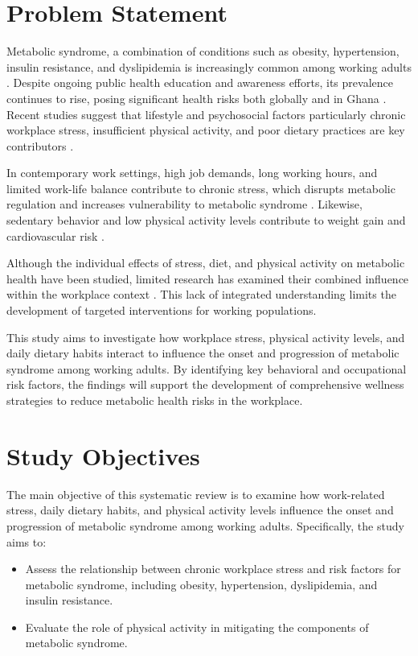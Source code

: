\section{Problem Statement}
Metabolic syndrome, a combination of conditions such as obesity, hypertension, insulin resistance, and dyslipidemia is increasingly common among working adults \citep{alberti2009harmonizing}. Despite ongoing public health education and awareness efforts, its prevalence continues to rise, posing significant health risks both globally and in Ghana \citep{adeboye2012epidemiology}. Recent studies suggest that lifestyle and psychosocial factors particularly chronic workplace stress, insufficient physical activity, and poor dietary practices are key contributors \citep{griep2015job}.

\par In contemporary work settings, high job demands, long working hours, and limited work-life balance contribute to chronic stress, which disrupts metabolic regulation and increases vulnerability to metabolic syndrome \citep{chandola2006work}. Likewise, sedentary behavior and low physical activity levels contribute to weight gain and cardiovascular risk \citep{warburton2006health}. %

\par Although the individual effects of stress, diet, and physical activity on metabolic health have been studied, limited research has examined their combined influence within the workplace context \citep{esler2017stress}. This lack of integrated understanding limits the development of targeted interventions for working populations.

\par This study aims to investigate how workplace stress, physical activity levels, and daily dietary habits interact to influence the onset and progression of metabolic syndrome among working adults. By identifying key behavioral and occupational risk factors, the findings will support the development of comprehensive wellness strategies to reduce metabolic health risks in the workplace.

\section{Study Objectives}
The main objective of this systematic review is to examine how work-related stress, daily dietary habits, and physical activity levels influence the onset and progression of metabolic syndrome among working adults. Specifically, the study aims to:
\begin{itemize}
    \item Assess the relationship between chronic workplace stress and risk factors for metabolic syndrome, including obesity, hypertension, dyslipidemia, and insulin resistance. 
    \item Evaluate the role of physical activity in mitigating the components of metabolic syndrome. 
\end{itemize}

